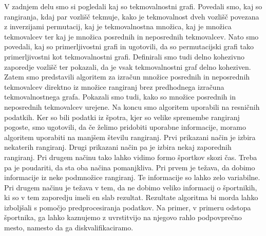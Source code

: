 \documentclass[a4paper, 12pt]{book}
\begin{document}
V zadnjem delu smo si pogledali kaj so tekmovalnostni grafi. Povedali smo, kaj so rangiranja, kdaj par vozlišč tekmuje, kako je tekmovalnost dveh vozlišč povezana z inverzijami permutacij, kaj je tekmovalnostna množica, kaj je množica tekmovalcev ter kaj je množica posrednih in neposrednih tekmovalcev. Nato smo povedali, kaj so primerljivostni grafi in ugotovili, da so permutacijski grafi tako primerljivostni kot tekmovalnostni grafi. Definirali smo tudi delno kohezivno zaporedje vozlišč ter pokazali, da je vsak tekmovalnostni graf delno koheziven. Zatem smo predstavili algoritem za izračun množice posrednih in neposrednih tekmovalcev direktno iz množice rangiranj brez predhodnega izračuna tekmovalnostnega grafa. Pokazali smo tudi, kako so množice posrednih in neposrednih tekmovalcev urejene. Na koncu smo algoritem uporabili na resničnih podatkih. Ker so bili podatki iz špotra, kjer so velike spremembe rangiranj pogoste, smo ugotovili, da če želimo pridobiti uporabne informacije, moramo algoritem uporabiti na manjšem številu rangiranj. Prvi prikazani način je izbira nekaterih rangiranj. Drugi prikazani način pa je izbira nekaj zaporednih rangiranj. Pri drugem načinu tako lahko vidimo formo športkov skozi čas. Treba pa je poudariti, da sta oba načina pomanjkliva. Pri prvem je težava, da dobimo informacije iz neke podmnožice rangiranj. Te informacije so lahko zelo variabilne. Pri drugem načinu je težava v tem, da ne dobimo veliko informacij o športnikih, ki so v tem zaporedju imeli en slab rezultat. Rezultate algoritma bi morda lahko izboljšali s pomočjo predprocesiranja podatkov. Na primer, v primeru odstopa športnika, ga lahko kaznujemo z uvrstitvijo na njegovo rahlo podpovprečno mesto, namesto da ga diskvalifikaciramo.

\cleardoublepage
{}


\end{document}
